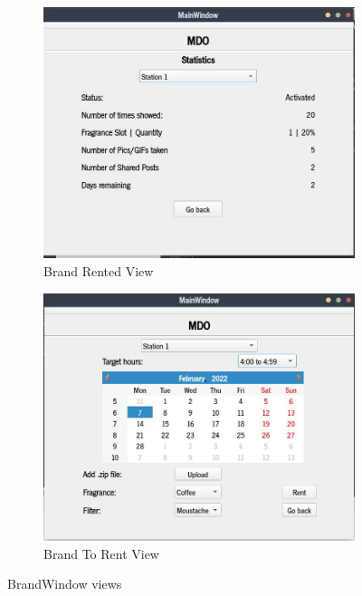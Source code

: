\begin{figure}[htb!]
%
  \begin{subfigure}{.4\textwidth}
    \includegraphics[width=\textwidth]{img/brand-rented-view.jpg}%
  \caption{Brand Rented View}%
  \label{fig:brand-rented-view}
  \end{subfigure}
  \begin{subfigure}{.4\textwidth}
    \includegraphics[width=\textwidth]{img/brand-to-rent-view.jpg}%
  \caption{Brand To Rent View}%
  \label{fig:brand-to-rent-view}
  \end{subfigure}
  \caption{BrandWindow views}%
  \label{fig:ptp-test}
\end{figure} 

